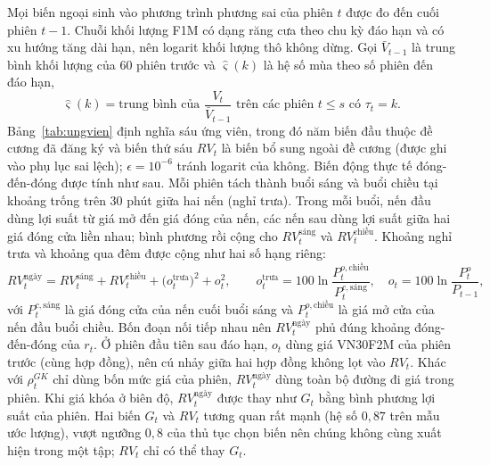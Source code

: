 \documentclass[12pt,a4paper]{article}
\theoremstyle{definition}
\theoremstyle{remark}
\begin{document}
Mọi biến ngoại sinh vào phương trình phương sai của phiên $t$ được đo đến cuối phiên $t-1$. Chuỗi khối lượng F1M có dạng răng cưa theo chu kỳ đáo hạn và có xu hướng tăng dài hạn, nên logarit khối lượng thô không dừng. Gọi $\bar V_{t-1}$ là trung bình khối lượng của $60$ phiên trước và $\hat\varsigma(k)$ là hệ số mùa theo số phiên đến đáo hạn,
\begin{equation}
\hat\varsigma(k)=\text{trung bình của } \frac{V_t}{\bar V_{t-1}} \text{ trên các phiên } t\le s \text{ có } \tau_t=k .
\end{equation}
Bảng~\ref{tab:ungvien} định nghĩa sáu ứng viên, trong đó năm biến đầu thuộc đề cương đã đăng ký và biến thứ sáu $RV_t$ là biến bổ sung ngoài đề cương (được ghi vào phụ lục sai lệch); $\epsilon=10^{-6}$ tránh logarit của không. Biến động thực tế đóng-đến-đóng được tính như sau. Mỗi phiên tách thành buổi sáng và buổi chiều tại khoảng trống trên $30$ phút giữa hai nến (nghỉ trưa). Trong mỗi buổi, nến đầu dùng lợi suất từ giá mở đến giá đóng của nến, các nến sau dùng lợi suất giữa hai giá đóng cửa liền nhau; bình phương rồi cộng cho $RV^{\text{sáng}}_t$ và $RV^{\text{chiều}}_t$. Khoảng nghỉ trưa và khoảng qua đêm được cộng như hai số hạng riêng:
\begin{equation}
RV^{\text{ngày}}_t=RV^{\text{sáng}}_t+RV^{\text{chiều}}_t+\big(o^{\text{trưa}}_t\big)^2+o_t^2,\qquad o^{\text{trưa}}_t=100\ln\frac{P^{o,\text{chiều}}_t}{P^{c,\text{sáng}}_t},\quad o_t=100\ln\frac{P^{o}_t}{P_{t-1}},
\end{equation}
với $P^{c,\text{sáng}}_t$ là giá đóng cửa của nến cuối buổi sáng và $P^{o,\text{chiều}}_t$ là giá mở cửa của nến đầu buổi chiều. Bốn đoạn nối tiếp nhau nên $RV^{\text{ngày}}_t$ phủ đúng khoảng đóng-đến-đóng của $r_t$. Ở phiên đầu tiên sau đáo hạn, $o_t$ dùng giá VN30F2M của phiên trước (cùng hợp đồng), nên cú nhảy giữa hai hợp đồng không lọt vào $RV_t$. Khác với $\rho^{GK}_t$ chỉ dùng bốn mức giá của phiên, $RV^{\text{ngày}}_t$ dùng toàn bộ đường đi giá trong phiên. Khi giá khóa ở biên độ, $RV^{\text{ngày}}_t$ được thay như $G_t$ bằng bình phương lợi suất của phiên. Hai biến $G_t$ và $RV_t$ tương quan rất mạnh (hệ số $0{,}87$ trên mẫu ước lượng), vượt ngưỡng $0{,}8$ của thủ tục chọn biến nên chúng không cùng xuất hiện trong một tập; $RV_t$ chỉ có thể thay $G_t$.
\end{document}
